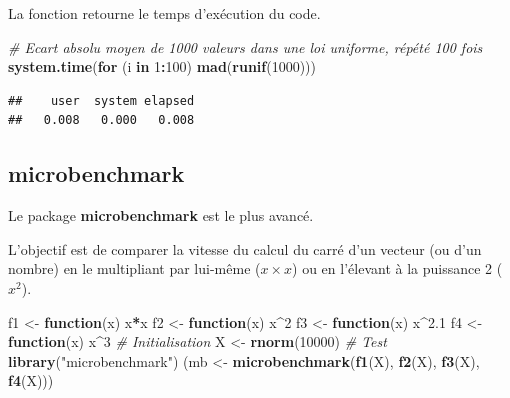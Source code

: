 \documentclass[
  12pt,
  french,
  a4paper,
  extrafontsizes,onecolumn,openright
  ]{memoir}
\newenvironment{Shaded}{\begin{snugshade}}{\end{snugshade}}
\newcommand{\CommentTok}[1]{\textcolor[rgb]{0.56,0.35,0.01}{\textit{#1}}}
\newcommand{\ControlFlowTok}[1]{\textcolor[rgb]{0.13,0.29,0.53}{\textbf{#1}}}
\newcommand{\DecValTok}[1]{\textcolor[rgb]{0.00,0.00,0.81}{#1}}
\newcommand{\FloatTok}[1]{\textcolor[rgb]{0.00,0.00,0.81}{#1}}
\newcommand{\FunctionTok}[1]{\textcolor[rgb]{0.13,0.29,0.53}{\textbf{#1}}}
\newcommand{\NormalTok}[1]{#1}
\newcommand{\OtherTok}[1]{\textcolor[rgb]{0.56,0.35,0.01}{#1}}
\newcommand{\SpecialCharTok}[1]{\textcolor[rgb]{0.81,0.36,0.00}{\textbf{#1}}}
\newcommand{\StringTok}[1]{\textcolor[rgb]{0.31,0.60,0.02}{#1}}
\begin{document}
La fonction retourne le temps d'exécution du code.

\scriptsize

\begin{Shaded}
\begin{Highlighting}[]
\CommentTok{\# Ecart absolu moyen de 1000 valeurs dans une loi uniforme, répété 100 fois}
\FunctionTok{system.time}\NormalTok{(}\ControlFlowTok{for}\NormalTok{ (i }\ControlFlowTok{in} \DecValTok{1}\SpecialCharTok{:}\DecValTok{100}\NormalTok{) }\FunctionTok{mad}\NormalTok{(}\FunctionTok{runif}\NormalTok{(}\DecValTok{1000}\NormalTok{)))}
\end{Highlighting}
\end{Shaded}

\begin{verbatim}
##    user  system elapsed 
##   0.008   0.000   0.008
\end{verbatim}

\normalsize

\subsection{microbenchmark}\label{microbenchmark}

Le package \textbf{microbenchmark} est le plus avancé.

L'objectif est de comparer la vitesse du calcul du carré d'un vecteur (ou d'un nombre) en le multipliant par lui-même (\(x \times x\)) ou en l'élevant à la puissance 2 (\(x^2\)).

\scriptsize

\begin{Shaded}
\begin{Highlighting}[]
\NormalTok{f1 }\OtherTok{\textless{}{-}} \ControlFlowTok{function}\NormalTok{(x) x}\SpecialCharTok{*}\NormalTok{x}
\NormalTok{f2 }\OtherTok{\textless{}{-}} \ControlFlowTok{function}\NormalTok{(x) x}\SpecialCharTok{\^{}}\DecValTok{2}
\NormalTok{f3 }\OtherTok{\textless{}{-}} \ControlFlowTok{function}\NormalTok{(x) x}\SpecialCharTok{\^{}}\FloatTok{2.1}
\NormalTok{f4 }\OtherTok{\textless{}{-}} \ControlFlowTok{function}\NormalTok{(x) x}\SpecialCharTok{\^{}}\DecValTok{3}
\CommentTok{\# Initialisation}
\NormalTok{X }\OtherTok{\textless{}{-}} \FunctionTok{rnorm}\NormalTok{(}\DecValTok{10000}\NormalTok{)}
\CommentTok{\# Test}
\FunctionTok{library}\NormalTok{(}\StringTok{"microbenchmark"}\NormalTok{)}
\NormalTok{(mb }\OtherTok{\textless{}{-}} \FunctionTok{microbenchmark}\NormalTok{(}\FunctionTok{f1}\NormalTok{(X), }\FunctionTok{f2}\NormalTok{(X), }\FunctionTok{f3}\NormalTok{(X), }\FunctionTok{f4}\NormalTok{(X)))}
\end{Highlighting}
\end{Shaded}
\end{document}
